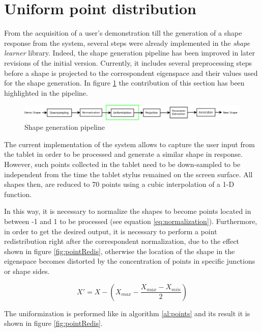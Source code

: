 \section{Uniform point distribution}  

From the acquisition of a user's demonstration till the generation of a shape response from the system, several steps were already implemented in the \textit{shape learner} library. Indeed, the shape generation pipeline has been improved in later revisions of the initial version. Currently, it includes several preprocessing steps before a shape is projected to the correspondent eigenspace and their values used for the shape generation. In figure \ref{fig:shapeProcess} the contribution of this section has been highlighted in the pipeline. 

\begin{figure}[h!]
        \centering
        \includegraphics[width=1\textwidth]{figures/shapeProcess.png}
        \caption{Shape generation pipeline }
        \label{fig:shapeProcess}
\end{figure}

The current implementation of the system allows to capture the user input from the tablet in order to be processed and generate a similar shape in response. However, such points collected in the tablet need to be down-sampled to be independent from the time the tablet stylus remained on the screen surface. All shapes then, are reduced to 70 points using a cubic interpolation of a 1-D function.

In this way, it is necessary to normalize the shapes to become points located in between -1 and 1 to be processed (see equation \ref{eq:normalization}). Furthermore, in order to get the desired output, it is necessary to perform a point redistribution right after the correspondent normalization, due to the effect shown in figure \ref{fig:pointRedis}, otherwise the location of the shape in the eigenspace becomes distorted by the concentration of points in specific junctions or shape sides.

\begin{equation} \label{eq:normalization}
X' = X - (X_{max} - \frac{X_{max} - X_{min}}{2} )
\end{equation}

The uniformization is performed like in algorithm \ref{al:points} and its result it is shown in figure \ref{fig:pointRedis}.


